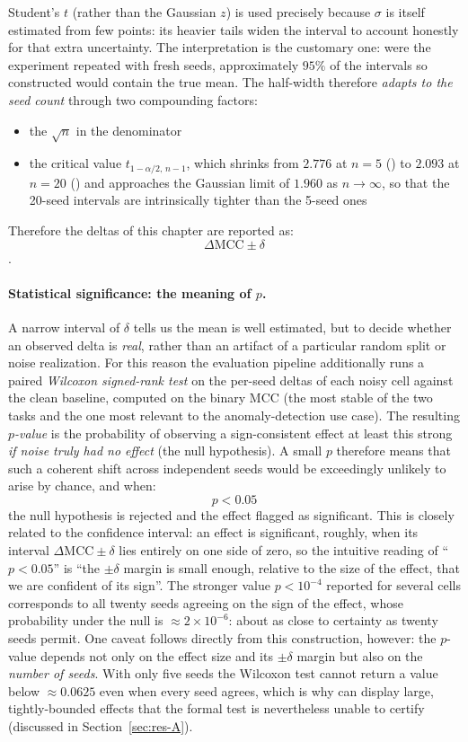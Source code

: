 \documentclass[../main.tex]{subfiles}
\begin{document}
Student's $t$ (rather than the Gaussian $z$) is used precisely because $\sigma$ is itself estimated from few points: its heavier tails widen the interval to account honestly for that extra uncertainty. The interpretation is the customary one: were the experiment repeated with fresh seeds, approximately $95\%$ of the intervals so constructed would contain the true mean. The half-width therefore \emph{adapts to the seed count} through two compounding factors:
\begin{itemize}
    \item the $\sqrt{n}$ in the denominator
    \item the critical value $t_{1-\alpha/2,\,n-1}$, which shrinks from $2.776$ at $n=5$ () to $2.093$ at $n=20$ () and approaches the Gaussian limit of $1.960$ as $n\!\to\!\infty$, so that the 20-seed  intervals are intrinsically tighter than the 5-seed  ones
\end{itemize}

Therefore the deltas of this chapter are reported as: $$\Delta\mathrm{MCC} \pm \delta$$.

\paragraph{Statistical significance: the meaning of $p$.}
A narrow interval of $\delta$ tells us the mean is well estimated, but to decide whether an observed delta is \emph{real}, rather than an artifact of a particular random split or noise realization. For this reason the evaluation pipeline additionally runs a paired \emph{Wilcoxon signed-rank test} on the per-seed deltas of each noisy cell against the clean baseline, computed on the binary MCC (the most stable of the two tasks and the one most relevant to the anomaly-detection use case). The resulting \emph{$p$-value} is the probability of observing a sign-consistent effect at least this strong \emph{if noise truly had no effect} (the null hypothesis). A small $p$ therefore means that such a coherent shift across independent seeds would be exceedingly unlikely to arise by chance, and when: $$p < 0.05$$the null hypothesis is rejected and the effect flagged as significant. This is closely related to the confidence interval: an effect is significant, roughly, when its interval $\Delta\mathrm{MCC} \pm \delta$ lies entirely on one side of zero, so the intuitive reading of ``$p < 0.05$'' is ``the $\pm\delta$ margin is small enough, relative to the size of the effect, that we are confident of its sign''. The stronger value $p < 10^{-4}$ reported for several  cells corresponds to all twenty seeds agreeing on the sign of the effect, whose probability under the null is $\approx 2\times 10^{-6}$: about as close to certainty as twenty seeds permit. One caveat follows directly from this construction, however: the $p$-value depends not only on the effect size and its $\pm\delta$ margin but also on the \emph{number of seeds}. With only five seeds the Wilcoxon test cannot return a value below $\approx 0.0625$ even when every seed agrees, which is why  can display large, tightly-bounded effects that the formal test is nevertheless unable to certify (discussed in Section~\ref{sec:res-A}).
\end{document}
